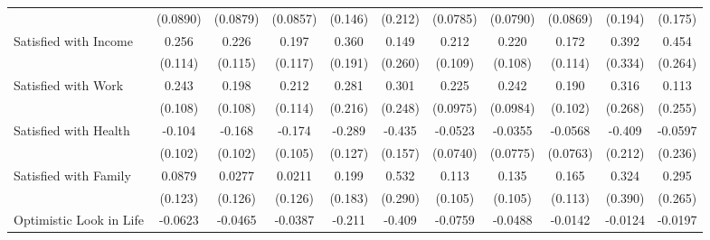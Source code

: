 {\begin{tabular}{l*{10}{c}}
            &    (0.0890)         &    (0.0879)         &    (0.0857)         &     (0.146)         &     (0.212)         &    (0.0785)         &    (0.0790)         &    (0.0869)         &     (0.194)         &     (0.175)         \\
\addlinespace
Satisfied with Income&       0.256\sym{*}  &       0.226\sym{*}  &       0.197         &       0.360         &       0.149         &       0.212         &       0.220\sym{*}  &       0.172         &       0.392         &       0.454         \\
            &     (0.114)         &     (0.115)         &     (0.117)         &     (0.191)         &     (0.260)         &     (0.109)         &     (0.108)         &     (0.114)         &     (0.334)         &     (0.264)         \\
\addlinespace
Satisfied with Work&       0.243\sym{*}  &       0.198         &       0.212         &       0.281         &       0.301         &       0.225\sym{*}  &       0.242\sym{*}  &       0.190         &       0.316         &       0.113         \\
            &     (0.108)         &     (0.108)         &     (0.114)         &     (0.216)         &     (0.248)         &    (0.0975)         &    (0.0984)         &     (0.102)         &     (0.268)         &     (0.255)         \\
\addlinespace
Satisfied with Health&      -0.104         &      -0.168         &      -0.174         &      -0.289\sym{*}  &      -0.435\sym{**} &     -0.0523         &     -0.0355         &     -0.0568         &      -0.409         &     -0.0597         \\
            &     (0.102)         &     (0.102)         &     (0.105)         &     (0.127)         &     (0.157)         &    (0.0740)         &    (0.0775)         &    (0.0763)         &     (0.212)         &     (0.236)         \\
\addlinespace
Satisfied with Family&      0.0879         &      0.0277         &      0.0211         &       0.199         &       0.532         &       0.113         &       0.135         &       0.165         &       0.324         &       0.295         \\
            &     (0.123)         &     (0.126)         &     (0.126)         &     (0.183)         &     (0.290)         &     (0.105)         &     (0.105)         &     (0.113)         &     (0.390)         &     (0.265)         \\
\addlinespace
Optimistic Look in Life&     -0.0623         &     -0.0465         &     -0.0387         &      -0.211         &      -0.409\sym{***}&     -0.0759         &     -0.0488         &     -0.0142         &     -0.0124         &     -0.0197         \\

\end{tabular}}
